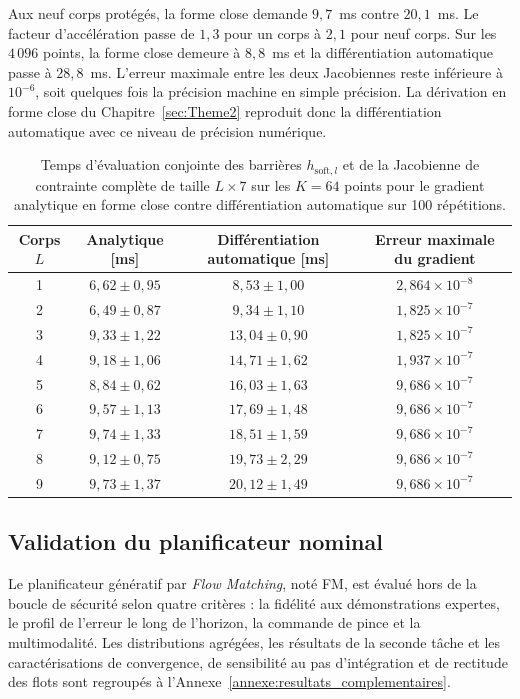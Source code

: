 Aux neuf corps protégés, la forme close demande $9{,}7$~ms contre $20{,}1$~ms. Le facteur d'accélération passe de $1{,}3$ pour un corps à $2{,}1$ pour neuf corps. Sur les $4\,096$ points, la forme close demeure à $8{,}8$~ms et la différentiation automatique passe à $28{,}8$~ms. L'erreur maximale entre les deux Jacobiennes reste inférieure à $10^{-6}$, soit quelques fois la précision machine en simple précision. La dérivation en forme close du Chapitre~\ref{sec:Theme2} reproduit donc la différentiation automatique avec ce niveau de précision numérique.

\begin{table}[!htbp]
\centering
\caption[Temps d'évaluation des barrières et de la Jacobienne]{Temps d'évaluation conjointe des barrières $h_{\mathrm{soft},l}$ et de la Jacobienne de contrainte complète de taille $L\times 7$ sur les $K = 64$ points pour le gradient analytique en forme close contre différentiation automatique sur 100 répétitions.}
\label{tab:gradient_comparison}
\small
\begin{tabular}{cccc}
\toprule
Corps $L$ & Analytique [ms] & Différentiation automatique [ms] & Erreur maximale du gradient \\
\midrule
1 & $6{,}62 \pm 0{,}95$ & $8{,}53 \pm 1{,}00$ & $2{,}864 \times 10^{-8}$ \\
2 & $6{,}49 \pm 0{,}87$ & $9{,}34 \pm 1{,}10$ & $1{,}825 \times 10^{-7}$ \\
3 & $9{,}33 \pm 1{,}22$ & $13{,}04 \pm 0{,}90$ & $1{,}825 \times 10^{-7}$ \\
4 & $9{,}18 \pm 1{,}06$ & $14{,}71 \pm 1{,}62$ & $1{,}937 \times 10^{-7}$ \\
5 & $8{,}84 \pm 0{,}62$ & $16{,}03 \pm 1{,}63$ & $9{,}686 \times 10^{-7}$ \\
6 & $9{,}57 \pm 1{,}13$ & $17{,}69 \pm 1{,}48$ & $9{,}686 \times 10^{-7}$ \\
7 & $9{,}74 \pm 1{,}33$ & $18{,}51 \pm 1{,}59$ & $9{,}686 \times 10^{-7}$ \\
8 & $9{,}12 \pm 0{,}75$ & $19{,}73 \pm 2{,}29$ & $9{,}686 \times 10^{-7}$ \\
9 & $9{,}73 \pm 1{,}37$ & $20{,}12 \pm 1{,}49$ & $9{,}686 \times 10^{-7}$ \\
\bottomrule
\end{tabular}
\end{table}

\subsection{Validation du planificateur nominal}\label{subsec:res_fm}
Le planificateur génératif par \textit{Flow Matching}, noté \ac{FM}, est évalué hors de la boucle de sécurité selon quatre critères : la fidélité aux démonstrations expertes, le profil de l'erreur le long de l'horizon, la commande de pince et la multimodalité. Les distributions agrégées, les résultats de la seconde tâche et les caractérisations de convergence, de sensibilité au pas d'intégration et de rectitude des flots sont regroupés à l'Annexe~\ref{annexe:resultats_complementaires}.

